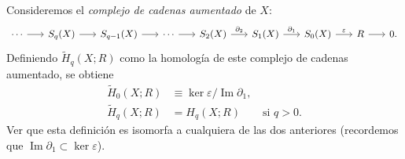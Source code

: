 \begin{ejercicio}
Consideremos el \textit{complejo de cadenas aumentado} de $X$:
\[
\begin{tikzcd}[column sep=1.7em]
\cdots \arrow[r] & S_q(X) \arrow[r] & S_{q-1}(X) \arrow[r] & \cdots \arrow[r] & S_2(X) \arrow[r, "\partial_2"] & S_1(X) \arrow[r, "\partial_1"] & S_0(X) \arrow[r, "\varepsilon"] & R \arrow[r] & 0.
\end{tikzcd}
\]
Definiendo $\widetilde{H}_q(X; R)$ como la homología de este complejo de cadenas aumentado, se obtiene
\begin{align*}
\widetilde{H}_0(X; R) &\equiv \ker\varepsilon / \operatorname{Im}\partial_1, \\
\widetilde{H}_q(X; R) &= H_q(X; R) \qquad \text{si } q > 0.
\end{align*}
Ver que esta definición es isomorfa a cualquiera de las dos anteriores (recordemos que $\operatorname{Im}\partial_1 \subset \ker\varepsilon$).
\end{ejercicio}

\begin{demostracion}

\end{demostracion}
